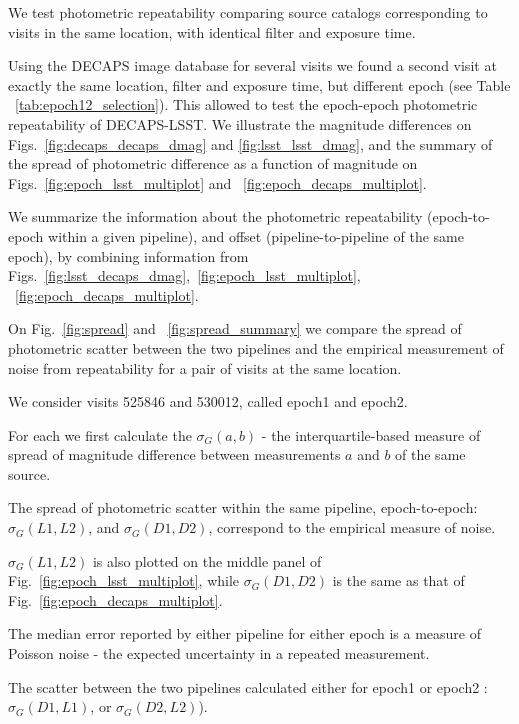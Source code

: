 \documentclass[DM,lsstdraft,toc,usenatbib]{lsstdoc}
\begin{document}
We test photometric repeatability comparing source catalogs corresponding to visits in the same location, with identical filter and exposure time.  



Using the DECAPS image database for several visits we found a second visit at exactly the same location, filter and exposure time, but different epoch (see Table ~\ref{tab:epoch12_selection}).  This allowed to test the epoch-epoch photometric repeatability of DECAPS-LSST. We illustrate the  magnitude differences on Figs.~\ref{fig:decaps_decaps_dmag} and \ref{fig:lsst_lsst_dmag}, and the summary of the spread of photometric difference as a function of magnitude on Figs.~\ref{fig:epoch_lsst_multiplot} and ~\ref{fig:epoch_decaps_multiplot}. 


We summarize the information about the photometric repeatability (epoch-to-epoch within a given pipeline), and offset (pipeline-to-pipeline of the same epoch), by combining information from  Figs.~\ref{fig:lsst_decaps_dmag},~\ref{fig:epoch_lsst_multiplot}, ~\ref{fig:epoch_decaps_multiplot}. 

On Fig.~\ref{fig:spread} and ~\ref{fig:spread_summary} we compare the spread of photometric scatter between the 
two pipelines and  the empirical measurement of noise from repeatability for a pair of visits at the same location. 

We consider visits  525846 and 530012, called epoch1 and epoch2. 

For each we first calculate the $\sigma_{G}(a,b)$  - the interquartile-based measure of spread of magnitude difference between measurements $a$ and $b$ of the same source. 

The spread of photometric scatter within the same pipeline, epoch-to-epoch: $\sigma_{G}(L1, L2)$, and $\sigma_{G}(D1,D2)$, correspond to the empirical measure of noise. 

$\sigma_{G}(L1, L2)$  is also plotted on the middle panel of Fig.~\ref{fig:epoch_lsst_multiplot}, while  $\sigma_{G}(D1,D2)$ is the same as that of Fig.~\ref{fig:epoch_decaps_multiplot}. 

The median error reported by either pipeline for either epoch is a measure of Poisson noise - the expected uncertainty in a repeated measurement. 

The scatter between the two pipelines calculated either for epoch1 or epoch2 :  $\sigma_{G}(D1,L1)$, or $\sigma_{G}(D2,L2)$). 
\end{document}
